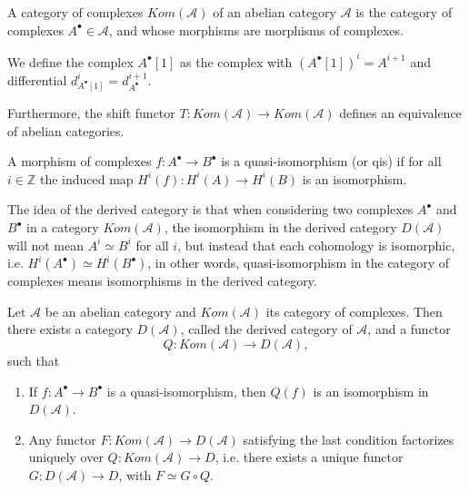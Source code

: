 \documentclass[
	oldfontcommands,
	sumario=abnt-6027-2012,
	12pt,			%
	openright,		%
	oneside,		%
	a4paper,		%
	english,		%
	brazil			%
	]{imecc-unicamp}
\begin{document}
\begin{definition}
	A category of complexes $Kom(\mathcal A)$ of an abelian category $\mathcal A$ is the category of complexes $A^\bullet\in \mathcal A$, and whose morphisms are morphisms of complexes.
	
	We define the complex $A^\bullet[1]$ as the complex with $(A^\bullet[1])^i=A^{i+1}$ and differential $d^i_{A^\bullet[1]}=d^{i+1}_{A^\bullet}.$
	
	Furthermore, the shift functor $T:Kom(\mathcal A)\rightarrow Kom(\mathcal{A})$ defines an equivalence of abelian categories.
	
	A morphism of complexes $f:A^\bullet\rightarrow B^\bullet$ is a quasi-isomorphism (or qis) if for all $i\in\mathbb Z$ the induced map $H^i(f):H^i(A)\rightarrow H^i(B)$ is an isomorphism.
\end{definition}

The idea of the derived category is that when considering two complexes $A^\bullet$ and $B^\bullet$ in a category $Kom(\mathcal A)$, the isomorphism in the derived category $D(\mathcal A)$ will not mean $A^i\simeq B^i$ for all $i$, but instead that each cohomology is isomorphic, i.e. $H^i(A^\bullet)\simeq H^i(B^\bullet)$, in other words, quasi-isomorphism in the category of complexes means isomorphisms in the derived category.

\begin{teorema}
	Let $\mathcal A$ be an abelian category and $Kom(\mathcal A)$ its category of complexes. Then there exists a category $D(\mathcal A)$, called the derived category of $\mathcal A$, and a functor 
	$$
	Q:Kom(\mathcal A)\rightarrow D(\mathcal A),
	$$
	such that
	\begin{enumerate}
		\item If $f:A^\bullet\rightarrow B^\bullet$ is a quasi-isomorphism, then $Q(f)$ is an isomorphism in $D(\mathcal A)$.
		\item Any functor $F:Kom(\mathcal A)\rightarrow D(\mathcal A)$ satisfying the last condition factorizes uniquely over $Q:Kom(\mathcal A)\rightarrow D$, i.e. there exists a unique functor $G:D(\mathcal A)\rightarrow D$, with $F\simeq G\circ Q$.
	\end{enumerate}
\end{teorema}
\end{document}
